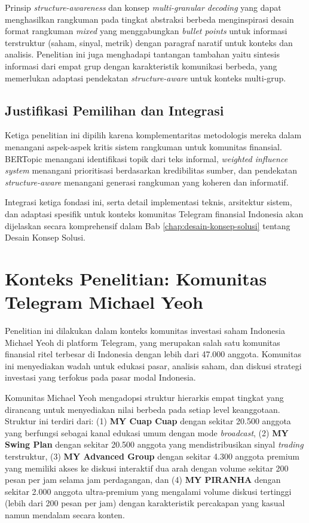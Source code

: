 Prinsip \textit{structure-awareness} dan konsep \textit{multi-granular decoding} yang dapat menghasilkan rangkuman pada tingkat abstraksi berbeda menginspirasi desain format rangkuman \textit{mixed} yang menggabungkan \textit{bullet points} untuk informasi terstruktur (saham, sinyal, metrik) dengan paragraf naratif untuk konteks dan analisis. Penelitian ini juga menghadapi tantangan tambahan yaitu sintesis informasi dari empat grup dengan karakteristik komunikasi berbeda, yang memerlukan adaptasi pendekatan \textit{structure-aware} untuk konteks multi-grup.

\subsection{Justifikasi Pemilihan dan Integrasi}

Ketiga penelitian ini dipilih karena komplementaritas metodologis mereka dalam menangani aspek-aspek kritis sistem rangkuman untuk komunitas finansial. BERTopic menangani identifikasi topik dari teks informal, \textit{weighted influence system} menangani prioritisasi berdasarkan kredibilitas sumber, dan pendekatan \textit{structure-aware} menangani generasi rangkuman yang koheren dan informatif.

Integrasi ketiga fondasi ini, serta detail implementasi teknis, arsitektur sistem, dan adaptasi spesifik untuk konteks komunitas Telegram finansial Indonesia akan dijelaskan secara komprehensif dalam Bab \ref{chap:desain-konsep-solusi} tentang Desain Konsep Solusi.


\section{Konteks Penelitian: Komunitas Telegram Michael Yeoh}
\label{sec:konteks-penelitian}

Penelitian ini dilakukan dalam konteks komunitas investasi saham Indonesia Michael Yeoh di platform Telegram, yang merupakan salah satu komunitas finansial ritel terbesar di Indonesia dengan lebih dari 47.000 anggota. Komunitas ini menyediakan wadah untuk edukasi pasar, analisis saham, dan diskusi strategi investasi yang terfokus pada pasar modal Indonesia.

Komunitas Michael Yeoh mengadopsi struktur hierarkis empat tingkat yang dirancang untuk menyediakan nilai berbeda pada setiap level keanggotaan. Struktur ini terdiri dari: (1) \textbf{MY Cuap Cuap} dengan sekitar 20.500 anggota yang berfungsi sebagai kanal edukasi umum dengan mode \textit{broadcast}, (2) \textbf{MY Swing Plan} dengan sekitar 20.500 anggota yang mendistribusikan sinyal \textit{trading} terstruktur, (3) \textbf{MY Advanced Group} dengan sekitar 4.300 anggota premium yang memiliki akses ke diskusi interaktif dua arah dengan volume sekitar 200 pesan per jam selama jam perdagangan, dan (4) \textbf{MY PIRANHA} dengan sekitar 2.000 anggota ultra-premium yang mengalami volume diskusi tertinggi (lebih dari 200 pesan per jam) dengan karakteristik percakapan yang kasual namun mendalam secara konten.


